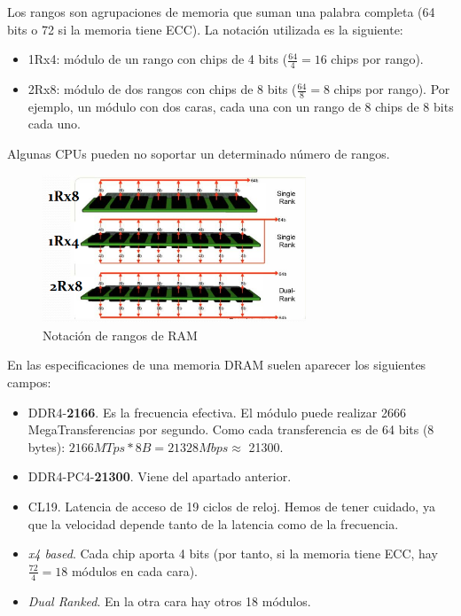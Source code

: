 \documentclass[12pt,spanish]{article}
\begin{document}
Los rangos son agrupaciones de memoria que suman una palabra completa (64 bits o 72 si la memoria tiene ECC). La notación utilizada es la siguiente:
\begin{itemize}
	\item 1Rx4: módulo de un rango con chips de 4 bits ($\frac{64}{4}= 16$ chips por rango).
	\item 2Rx8: módulo de dos rangos con chips de 8 bits ($\frac{64}{8}= 8$ chips por rango). Por ejemplo, un módulo con dos caras, cada una con un rango de 8 chips de 8 bits cada uno.
\end{itemize}

Algunas CPUs pueden no soportar un determinado número de rangos.

\begin{figure}[H]
	\centering
	\includegraphics[width=0.7\textwidth]{ramranks.png}
	\caption{Notación de rangos de RAM}
\end{figure}

En las especificaciones de una memoria DRAM suelen aparecer los siguientes campos:
\begin{itemize}
	\item DDR4-\textbf{2166}. Es la frecuencia efectiva. El módulo puede realizar 2666 MegaTransferencias por segundo. Como cada transferencia es de 64 bits (8 bytes): $2166 MTps * 8 B= 21328Mbps \approx$ 21300.
	\item DDR4-PC4-\textbf{21300}. Viene del apartado anterior.
	\item CL19. Latencia de acceso de 19 ciclos de reloj. Hemos de tener cuidado, ya que la velocidad depende tanto de la latencia como de la frecuencia.
	\item \textit{x4 based}. Cada chip aporta 4 bits (por tanto, si la memoria tiene ECC, hay $\frac{72}{4}=18$ módulos en cada cara).
	\item \textit{Dual Ranked}. En la otra cara hay otros 18 módulos.
\end{itemize}

\end{document}
